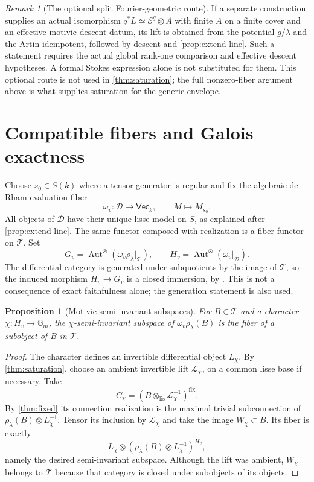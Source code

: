 \documentclass[11pt]{article}
\numberwithin{equation}{section}
\newtheorem{proposition}[proposition]{Proposition}
\theoremstyle{definition}
\theoremstyle{remark}
\newtheorem{remark}[remark]{Remark}
\newcommand{\Gm}{\mathbb G_m}
\newcommand{\Ecal}{\mathcal E}
\newcommand{\Tcal}{\mathcal T}
\newcommand{\Dcal}{\mathcal D}
\newcommand{\VecCat}{\mathsf{Vec}}
\newcommand{\Aut}{\operatorname{Aut}}
\newcommand{\lis}{\mathrm{lis}}
\newcommand{\fix}{\mathrm{fix}}
\begin{document}
\begin{remark}[The optional split Fourier-geometric route]
If a separate construction supplies an actual isomorphism
$q^*L\simeq\Ecal^g\otimes A$ with finite $A$ on a finite cover and an
effective motivic descent datum, its lift is obtained from the potential
$g/\lambda$ and the Artin idempotent, followed by descent and
\cref{prop:extend-line}. Such a statement requires the actual global
rank-one comparison and effective descent hypotheses. A formal Stokes
expression alone is not substituted for them. This optional route is not
used in \cref{thm:saturation}; the full nonzero-fiber argument above is
what supplies saturation for the generic envelope.
\end{remark}

\section{Compatible fibers and Galois exactness}\label{sec:galois}

Choose $s_0\in S(k)$ where a tensor generator is regular and fix the
algebraic de Rham evaluation fiber
\[
 \omega_v:\Dcal\longrightarrow\VecCat_k,\qquad M\longmapsto M_{s_0}.
\]
All objects of $\Dcal$ have their unique lisse model on $S$, as explained
after \cref{prop:extend-line}. The same functor composed with realization
is a fiber functor on $\Tcal$. Set
\[
 G_v=\Aut^\otimes(\omega_v\rho_\lambda|_{\Tcal}),\qquad
 H_v=\Aut^\otimes(\omega_v|_{\Dcal}).
\]
The differential category is generated under subquotients by the image of
$\Tcal$, so the induced morphism $H_v\to G_v$ is a closed immersion,
by \cite[Proposition~2.21(b)]{DeligneMilne}. This is not a consequence
of exact faithfulness alone; the generation statement is also used.

\begin{proposition}[Motivic semi-invariant subspaces]\label{prop:semi}
For $B\in\Tcal$ and a character $\chi:H_v\to\Gm$, the
$\chi$-semi-invariant subspace of $\omega_v\rho_\lambda(B)$ is the
fiber of a subobject of $B$ in $\Tcal$.
\end{proposition}
\begin{proof}
The character defines an invertible differential object $L_\chi$.
By \cref{thm:saturation}, choose an ambient invertible lift
$\mathcal L_\chi$, on a common lisse base if necessary. Take
\[
 C_\chi=(B\otimes_{\lis}\mathcal L_\chi^{-1})^{\fix}.
\]
By \cref{thm:fixed} its connection realization is the maximal trivial
subconnection of $\rho_\lambda(B)\otimes L_\chi^{-1}$. Tensor its
inclusion by $\mathcal L_\chi$ and take the image $W_\chi\subset B$.
Its fiber is exactly
\[
 L_\chi\otimes
 (\rho_\lambda(B)\otimes L_\chi^{-1})^{H_v},
\]
namely the desired semi-invariant subspace. Although the lift was ambient,
$W_\chi$ belongs to $\Tcal$ because that category is closed under
subobjects of its objects.
\end{proof}
\end{document}
